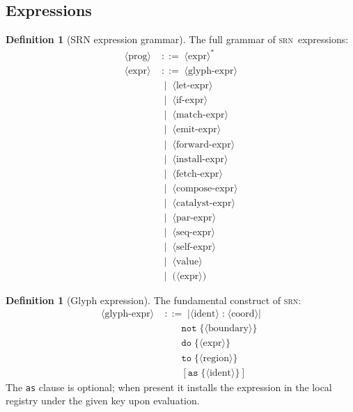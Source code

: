 \documentclass[twocolumn,11pt,a4paper]{article}
\theoremstyle{definition}
\newtheorem{definition}[theorem]{Definition}
\theoremstyle{remark}
\newcommand{\srn}{\textsc{srn}}
\newcommand{\bnfeq}{\;{::=}\;}
\newcommand{\bnfor}{\;\mid\;}
\begin{document}
\subsection{Expressions}
\label{subsec:exprsyntax}

\begin{definition}[SRN expression grammar]
\label{def:grammar}
The full grammar of \srn\ expressions:
\begin{align*}
\langle\text{prog}\rangle
  &\bnfeq \langle\text{expr}\rangle^*\\
\langle\text{expr}\rangle
  &\bnfeq \langle\text{glyph-expr}\rangle\\
  &\bnfor \langle\text{let-expr}\rangle\\
  &\bnfor \langle\text{if-expr}\rangle\\
  &\bnfor \langle\text{match-expr}\rangle\\
  &\bnfor \langle\text{emit-expr}\rangle\\
  &\bnfor \langle\text{forward-expr}\rangle\\
  &\bnfor \langle\text{install-expr}\rangle\\
  &\bnfor \langle\text{fetch-expr}\rangle\\
  &\bnfor \langle\text{compose-expr}\rangle\\
  &\bnfor \langle\text{catalyst-expr}\rangle\\
  &\bnfor \langle\text{par-expr}\rangle\\
  &\bnfor \langle\text{seq-expr}\rangle\\
  &\bnfor \langle\text{self-expr}\rangle\\
  &\bnfor \langle\text{value}\rangle\\
  &\bnfor \texttt{(}\langle\text{expr}\rangle\texttt{)}
\end{align*}
\end{definition}

\begin{definition}[Glyph expression]
\label{def:glyph}
The fundamental construct of \srn:
\begin{align*}
\langle\text{glyph-expr}\rangle
  &\bnfeq \texttt{|}\langle\text{ident}\rangle\;\texttt{:}\;\langle\text{coord}\rangle\texttt{|}\\
  &\quad\quad \texttt{not}\;\texttt{\{}\langle\text{boundary}\rangle\texttt{\}}\\
  &\quad\quad \texttt{do}\;\texttt{\{}\langle\text{expr}\rangle\texttt{\}}\\
  &\quad\quad \texttt{to}\;\texttt{\{}\langle\text{region}\rangle\texttt{\}}\\
  &\quad\quad [\texttt{as}\;\texttt{\{}\langle\text{ident}\rangle\texttt{\}}]
\end{align*}
The \texttt{as} clause is optional; when present it installs the
expression in the local registry under the given key upon evaluation.
\end{definition}
\end{document}
